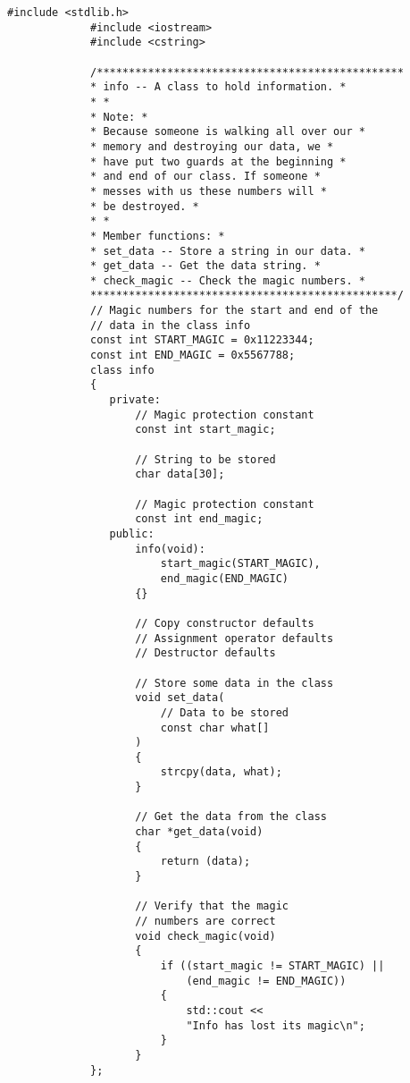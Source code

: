 \begin{LTR}
        \begin{lstlisting}[style=C++Style]
             #include <stdlib.h>
             #include <iostream>
             #include <cstring>

             /************************************************
             * info -- A class to hold information. *
             * *
             * Note: *
             * Because someone is walking all over our *
             * memory and destroying our data, we *
             * have put two guards at the beginning *
             * and end of our class. If someone *
             * messes with us these numbers will *
             * be destroyed. *
             * *
             * Member functions: *
             * set_data -- Store a string in our data. *
             * get_data -- Get the data string. *
             * check_magic -- Check the magic numbers. *
             ************************************************/
             // Magic numbers for the start and end of the
             // data in the class info
             const int START_MAGIC = 0x11223344;
             const int END_MAGIC = 0x5567788;
             class info
             {
             	private:
             		// Magic protection constant
             		const int start_magic;

             		// String to be stored
             		char data[30];

             		// Magic protection constant
             		const int end_magic;
             	public:
             		info(void):
             			start_magic(START_MAGIC),
             			end_magic(END_MAGIC)
             		{}

             		// Copy constructor defaults
             		// Assignment operator defaults
             		// Destructor defaults

             		// Store some data in the class
             		void set_data(
             			// Data to be stored
             			const char what[]
             		)
             		{
             			strcpy(data, what);
             		}

             		// Get the data from the class
             		char *get_data(void)
             		{
             			return (data);
             		}

             		// Verify that the magic
             		// numbers are correct
             		void check_magic(void)
             		{
             			if ((start_magic != START_MAGIC) ||
             				(end_magic != END_MAGIC))
             			{
             				std::cout <<
             				"Info has lost its magic\n";
             			}
             		}
             };


\end{lstlisting}
\end{LTR}
